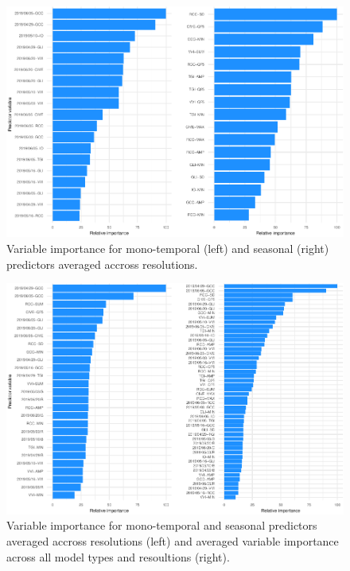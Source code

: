 \documentclass[]{article}
\begin{document}
\begin{figure}[H]

{\centering \includegraphics[height=0.4\textheight]{report_files/figure-latex/var_imp_indices-1} 

}

\caption{Variable importance for mono-temporal (left) and seasonal (right) predictors averaged accross resolutions.}\label{fig:var_imp_indices}
\end{figure}

\begin{figure}[H]

{\centering \includegraphics[height=0.4\textheight]{report_files/figure-latex/var_imp_all-1} 

}

\caption{Variable importance for mono-temporal and seasonal predictors averaged accross resolutions (left) and averaged variable importance across all model types and resoultions (right).}\label{fig:var_imp_all}
\end{figure}
\end{document}
